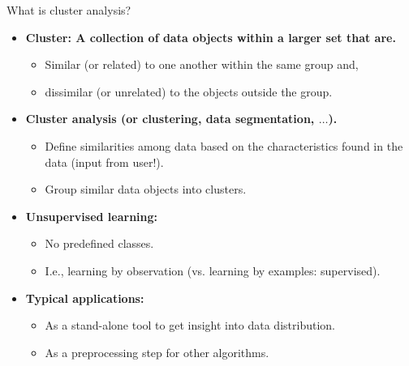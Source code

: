 \documentclass[aspectratio=169,t,xcolor=dvipsnames]{beamer}
\begin{document}
  {
    \begin{frame}{What is cluster analysis?}
        \begin{itemize}
          \item \textbf{{\color{airforceblue}Cluster}: A collection of data objects within a larger set that are.}
          \begin{itemize}
            \item {\color{airforceblue}Similar (or related)} to one another within the same group and,
            \item dissimilar (or unrelated) to the objects outside the group.
          \end{itemize}
          \item \textbf{{\color{airforceblue}Cluster analysis} (or clustering, data segmentation, $\ldots$).}
          \begin{itemize}
            \item {\color{airforceblue}Define similarities} among data based on the characteristics found in the data (input from user!).
            \item Group similar data objects into clusters.
          \end{itemize}
          \item \textbf{Unsupervised learning:}
          \begin{itemize}
            \item No predefined classes.
            \item I.e., learning by observation (vs. learning by examples: supervised).
          \end{itemize}
          \item \textbf{Typical applications:}
          \begin{itemize}
            \item As a stand-alone tool to get insight into data distribution.
            \item As a preprocessing step for other algorithms.
          \end{itemize}
        \end{itemize}
    \end{frame}
  }
\end{document}

